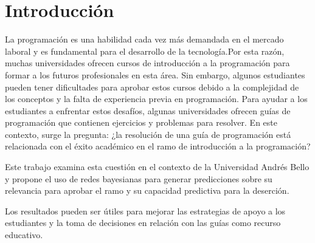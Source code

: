 \hypertarget{Introducción}{%
    \section{Introducción}\label{Introducción}}
La programación es una habilidad cada vez más demandada en el mercado laboral y es fundamental para el desarrollo de la tecnología.Por esta razón, muchas universidades ofrecen cursos de introducción a la programación para formar a los futuros profesionales en esta área. Sin embargo, algunos estudiantes pueden tener dificultades para aprobar estos cursos debido a la complejidad de los conceptos y la falta de experiencia previa en programación. Para ayudar a los estudiantes a enfrentar estos desafíos, algunas universidades ofrecen guías de programación que contienen ejercicios y 
problemas para resolver. En este contexto, surge la pregunta: ¿la resolución de una guía de programación está relacionada con el éxito académico en el ramo de introducción a la programación?

Este trabajo examina esta cuestión en el contexto de la Universidad Andrés Bello y propone el uso de redes bayesianas para generar predicciones sobre su relevancia para aprobar el ramo y su capacidad predictiva para la deserción.

Los resultados pueden ser útiles para mejorar las estrategias de apoyo a los estudiantes y la toma de decisiones en relación con las guías como recurso educativo.